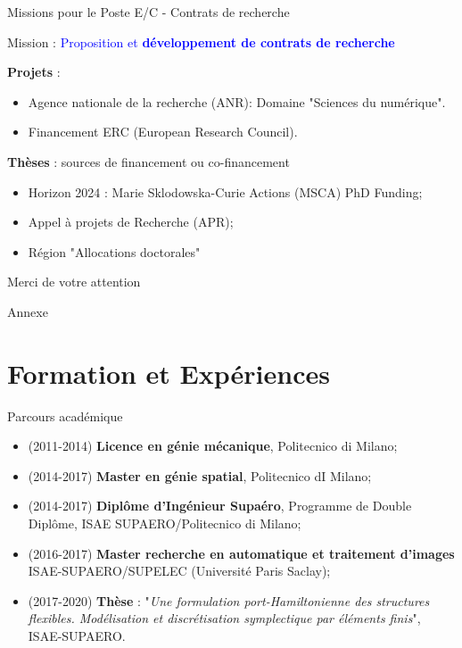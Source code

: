 \documentclass[aspectratio=169, french]{beamer}
\begin{document}
\begin{frame}{Missions pour le Poste E/C - Contrats de recherche}	
\begin{tcolorbox}
Mission : \textcolor{blue}{Proposition et \textbf{développement de contrats de recherche}}
\end{tcolorbox}
\textbf{Projets} : 
\begin{itemize}
	\item Agence nationale de la recherche (ANR): Domaine "Sciences du numérique".
	\item Financement ERC (European Research Council).
\end{itemize}

\textbf{Thèses} : sources de financement ou co-financement
\begin{itemize}
\item Horizon 2024 : Marie Sklodowska-Curie Actions (MSCA) PhD Funding;
\item Appel à projets de Recherche (APR);
\item Région "Allocations doctorales"
\end{itemize}

\end{frame}

\begin{frame}{}
	\centering
	\Large Merci de votre attention
\end{frame}

\appendix

\begin{frame}{}
	\centering
	\Huge{Annexe}
\end{frame}

\section{Formation et Expériences}

\begin{frame}{Parcours académique}
\begin{itemize}
	\item (2011-2014) \textbf{Licence en génie mécanique}, Politecnico di Milano;
	\item (2014-2017) \textbf{Master en génie spatial}, Politecnico dI Milano;
	\item (2014-2017) \textbf{Diplôme d’Ingénieur Supaéro}, Programme de
	Double Diplôme, ISAE SUPAERO/Politecnico di Milano;
	\item (2016-2017) \textbf{Master recherche en automatique et traitement d’images
	} ISAE-SUPAERO/SUPELEC (Université Paris Saclay);
	\item (2017-2020) \textbf{Thèse} : "\textit{Une formulation port-Hamiltonienne des structures flexibles. Modélisation et discrétisation symplectique par éléments finis}", ISAE-SUPAERO.
\end{itemize}
\end{frame}
\end{document}
